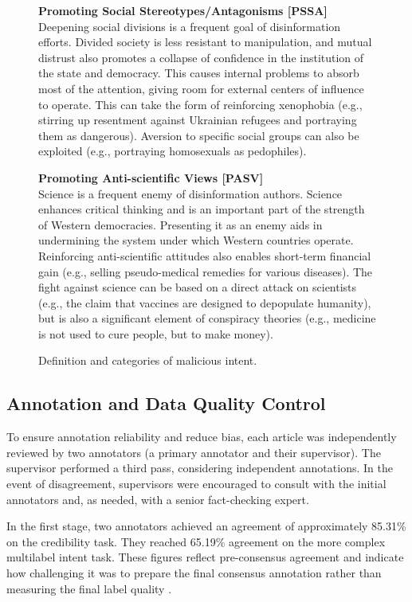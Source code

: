 \documentclass[11pt]{article}
\begin{document}
\begin{figure}[ht!]
{\begin{minipage}{0.94\columnwidth}
      \colorbox{orange!10}{\textbf{Promoting Social Stereotypes/Antagonisms [PSSA]}} \\
        Deepening social divisions is a frequent goal of disinformation efforts. Divided society is less resistant to manipulation, and mutual distrust also promotes a collapse of confidence in the institution of the state and democracy. This causes internal problems to absorb most of the attention, giving room for external centers of influence to operate. This can take the form of reinforcing xenophobia (e.g., stirring up resentment against Ukrainian refugees and portraying them as dangerous). Aversion to specific social groups can also be exploited (e.g., portraying homosexuals as pedophiles).
      
      \colorbox{orange!10}{\textbf{Promoting Anti-scientific Views  [PASV]}} \\  
        Science is a frequent enemy of disinformation authors. Science enhances critical thinking and is an important part of the strength of Western democracies. Presenting it as an enemy aids in undermining the system under which Western countries operate. Reinforcing anti-scientific attitudes also enables short-term financial gain (e.g., selling pseudo-medical remedies for various diseases). The fight against science can be based on a direct attack on scientists (e.g., the claim that vaccines are designed to depopulate humanity), but is also a significant element of conspiracy theories (e.g., medicine is not used to cure people, but to make money).
    \end{minipage}
  }
  \caption{Definition and categories of malicious intent.}
  \label{fig:mal_intent_taxonomy}
\end{figure}

\subsection{Annotation and Data Quality Control}

To ensure annotation reliability and reduce bias, each article was independently reviewed by two annotators (a primary annotator and their supervisor). The supervisor performed a third pass, considering independent annotations. In the event of disagreement, supervisors were encouraged to consult with the initial annotators and, as needed, with a senior fact-checking expert.

In the first stage, two annotators achieved an agreement of approximately 85.31\% on the credibility task. They reached 65.19\% agreement on the more complex multilabel intent task. These figures reflect pre-consensus agreement and indicate how challenging it was to prepare the final consensus annotation rather than measuring the final label quality \cite{piskorski2023multilingual}.
\end{document}
